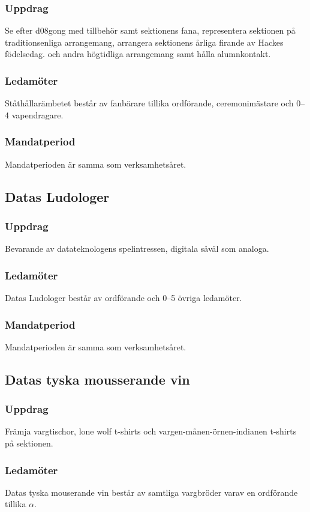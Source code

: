 \subsubsection{Uppdrag}
Se efter d08gong med tillbehör samt sektionens fana, representera sektionen på traditionsenliga arrangemang, arrangera sektionens årliga firande av Hackes födelsedag.
och andra högtidliga arrangemang samt hålla alumnkontakt.
\subsubsection{Ledamöter}
Ståthållarämbetet består av fanbärare tillika ordförande, ceremonimästare och 0--4 vapendragare.
\subsubsection{Mandatperiod}
Mandatperioden är samma som verksamhetsåret. 

\subsection{Datas Ludologer}
\subsubsection{Uppdrag}
Bevarande av datateknologens spelintressen, digitala såväl som analoga.
\subsubsection{Ledamöter}
Datas Ludologer består av ordförande och 0--5 övriga ledamöter.
\subsubsection{Mandatperiod}
Mandatperioden är samma som verksamhetsåret. 

\subsection{Datas tyska mousserande vin}
\subsubsection{Uppdrag}
Främja vargtischor, lone wolf t-shirts och vargen-månen-örnen-indianen t-shirts på sektionen.
\subsubsection{Ledamöter}
Datas tyska mouserande vin består av samtliga vargbröder varav en ordförande tillika $\alpha$. 
